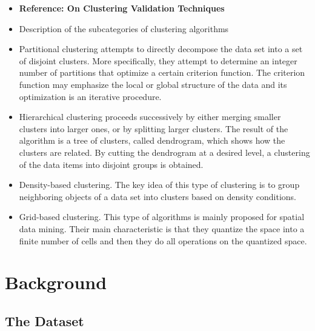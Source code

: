\documentclass[a4paper,10pt]{article}
\theoremstyle{plain}
\theoremstyle{definition}
\begin{document}
\begin{itemize}
	\item \textbf{Reference: On Clustering Validation Techniques}	
	
	\item Description of the subcategories of clustering algorithms
	
	\item Partitional clustering attempts to directly decompose the data set into a set of disjoint clusters. More specifically, they attempt to determine an integer number of partitions that optimize a certain criterion function. The criterion function may emphasize the local or global structure of the data and its optimization is an iterative procedure.

	\item Hierarchical clustering proceeds successively by either merging smaller clusters into larger ones, or by splitting larger clusters. The result of the algorithm is a tree of clusters, called dendrogram, which shows how the clusters are related. By cutting the dendrogram at a desired level, a clustering of the data items into disjoint groups is obtained.
	
	\item Density-based clustering. The key idea of this type of clustering is to group neighboring objects of a data set into clusters based on density conditions.

	\item Grid-based clustering. This type of algorithms is mainly proposed for spatial data mining. Their main characteristic is that they quantize the space into a finite number of cells and then they do all operations on the quantized space.
\end{itemize}


\newpage
\section{Background}

\subsection{The Dataset}
\end{document}
